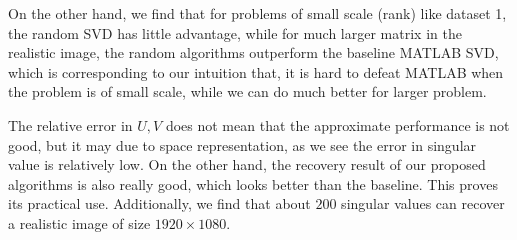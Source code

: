 \documentclass{article}
\begin{document}
On the other hand, we find that for problems of small scale (rank) like dataset 1, the random SVD has little advantage, while for much larger matrix in the realistic image, the random algorithms outperform the baseline MATLAB SVD, which is corresponding to our intuition that, it is hard to defeat MATLAB when the problem is of small scale, while we can do much better for larger problem.

The relative error in $U,V$ does not mean that the approximate performance is not good, but it may due to space representation, as we see the error in singular value is relatively low. On the other hand, the recovery result of our proposed algorithms is also really good, which looks better than the baseline. This proves its practical use. Additionally, we find that about $200$ singular values can recover a realistic image of size $1920\times 1080$.
\end{document}

